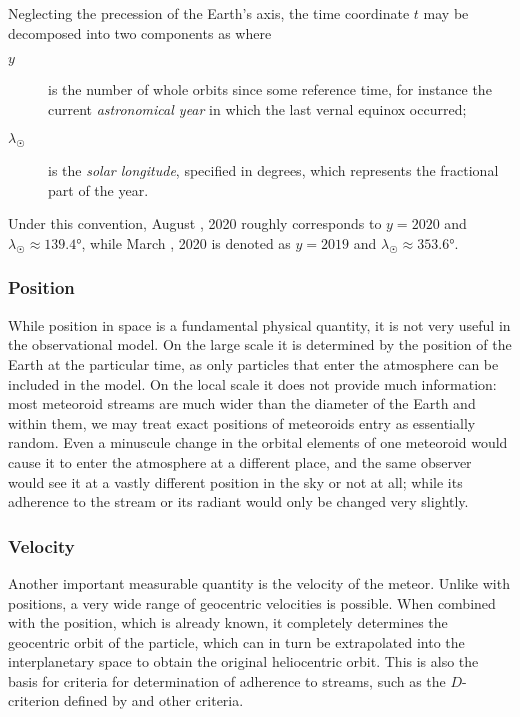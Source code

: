             Neglecting the precession of the Earth's axis, the time coordinate $t$ may be decomposed into two components as
            where
            \begin{description}
                \item[$y$]
                    is the number of whole orbits since some reference time,
                    for instance the current \emph{astronomical year} in which the last vernal equinox occurred;
                \item[$\lambda_\Sun$]
                    is the \emph{solar longitude}, specified in degrees, which represents the fractional part of the year.
            \end{description}

            \begin{example}
                Under this convention, August , 2020 roughly corresponds to $y = 2020$ and $\lambda_\Sun \approx \ang{139.4}$,
                while March , 2020 is denoted as $y = 2019$ and $\lambda_\Sun \approx \ang{353.6}$.
            \end{example}

        \subsubsection{Position} \label{mspp}
            While position in space is a fundamental physical quantity, it is not very useful in the observational model.
            On the large scale it is determined by the position of the Earth at the particular time,
            as only particles that enter the atmosphere can be included in the model.
            On the local scale it does not provide much information: most meteoroid streams
            are much wider than the diameter of the Earth and within them,
            we may treat exact positions of meteoroids entry as essentially random.
            Even a minuscule change in the orbital elements of one meteoroid
            would cause it to enter the atmosphere at a different place,
            and the same observer would see it at a vastly different position in the sky or not at all;
            while its adherence to the stream or its radiant would only be changed very slightly.

        \subsubsection{Velocity} \label{mspv}
            Another important measurable quantity is the velocity of the meteor.
            Unlike with positions, a very wide range of geocentric velocities is possible.
            When combined with the position, which is already known, it completely determines the geocentric
            orbit of the particle, which can in turn be extrapolated into the interplanetary space
            to obtain the original heliocentric orbit.
            This is also the basis for criteria for determination of adherence to streams,
            such as the $D$-criterion defined by \citet{southworth+1963} and other criteria.

